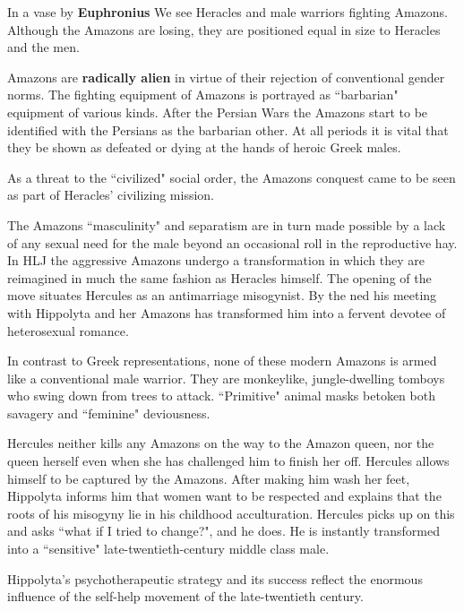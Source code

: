 \begin{rmk}
    In a vase by \textbf{Euphronius} We see Heracles and male warriors fighting Amazons. Although the Amazons are losing, they are positioned equal in size to Heracles and the men.
\end{rmk}

Amazons are \textbf{radically alien} in virtue of their rejection of conventional gender norms. The fighting equipment of Amazons is portrayed as ``barbarian" equipment of various kinds. After the Persian Wars the Amazons start to be identified with the Persians as the barbarian other. At all periods it is vital that they be shown as defeated or dying at the hands of heroic Greek males. 

\begin{nte}
    As a threat to the ``civilized" social order, the Amazons conquest came to be seen as part of Heracles' civilizing mission.
\end{nte}

The Amazons ``masculinity" and separatism are in turn made possible by a lack of any sexual need for the male beyond an occasional roll in the reproductive hay. In HLJ the aggressive Amazons undergo a transformation in which they are reimagined in much the same fashion as Heracles himself. The opening of the move situates Hercules as an antimarriage misogynist. By the ned his meeting with Hippolyta and her Amazons has transformed him into a fervent devotee of heterosexual romance.

In contrast to Greek representations, none of these modern Amazons is armed like a conventional male warrior. They are monkeylike, jungle-dwelling tomboys who swing down from trees to attack. ``Primitive" animal masks betoken both savagery and ``feminine" deviousness.

Hercules neither kills any Amazons on the way to the Amazon queen, nor the queen herself even when she has challenged him to finish her off. Hercules allows himself to be captured by the Amazons. After making him wash her feet, Hippolyta informs him that women want to be respected and explains that the roots of his misogyny lie in his childhood acculturation. Hercules picks up on this and asks ``what if I tried to change?", and he does. He is instantly transformed into a ``sensitive" late-twentieth-century middle class male.

\begin{rmk}
    Hippolyta's psychotherapeutic strategy and its success reflect the enormous influence of the self-help movement of the late-twentieth century.
\end{rmk}

